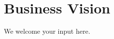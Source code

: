 \section{Business Vision}
\label{sec:ekg-mm-a-1-1}
\label{sec:ekg-mm-business-vision}



\ekgmmContextSection

We welcome your input here.
